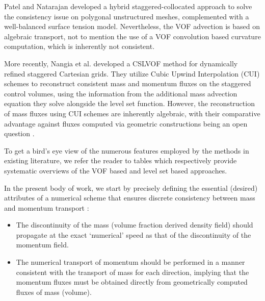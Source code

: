 Patel and Natarajan  developed a hybrid 
staggered-collocated approach to solve the consistency issue on 
polygonal unstructured meshes, complemented with a well-balanced surface tension model. 
Nevertheless, the VOF advection is based on algebraic transport, 
not to mention the use of a VOF convolution based 
curvature computation, which is inherently not consistent. 


More recently, Nangia et al.  developed a 
CSLVOF method for dynamically refined staggered Cartesian grids. 
They utilize Cubic Upwind Interpolation (CUI) schemes to 
reconstruct consistent mass and momentum fluxes on the staggered 
control volumes, using the information from the additional mass 
advection equation they solve alongside the level set function.   
However, the reconstruction of mass fluxes using CUI schemes are 
inherently algebraic, with their comparative advantage against fluxes 
computed via geometric constructions being an open question 
.

To get a bird's eye view of the numerous features employed by the methods 
in existing literature, we refer the reader to tables %
which respectively provide systematic overviews of the VOF based and level set based approaches.    


In the present body of work, we start by precisely defining the
essential (desired) attributes of a numerical scheme that 
ensures discrete consistency between mass and momentum transport : 

\begin{itemize}
	\item The discontinuity of the mass (volume fraction 
		derived density field) should propagate at the 
		exact `numerical' speed as that of 
		the discontinuity of the momentum field. 
	\item The numerical transport of momentum should be performed 
		in a manner consistent with the transport of mass for 
		each direction, implying that the momentum fluxes must 
		be obtained directly from geometrically 
		computed fluxes of mass (volume). 
\end{itemize}

